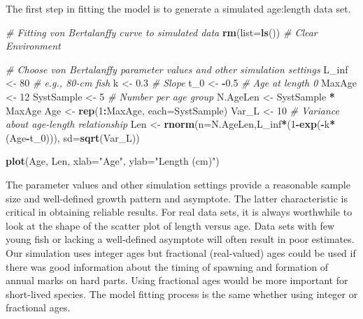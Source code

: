 \documentclass[
]{krantz}
\makeatletter
\newenvironment{Shaded}{\begin{snugshade}}{\end{snugshade}}
\newcommand{\AttributeTok}[1]{\textcolor[rgb]{0.27,0.27,0.27}{#1}}
\newcommand{\CommentTok}[1]{\textcolor[rgb]{0.37,0.37,0.37}{\textit{#1}}}
\newcommand{\DecValTok}[1]{\textcolor[rgb]{0.06,0.06,0.06}{#1}}
\newcommand{\FloatTok}[1]{\textcolor[rgb]{0.06,0.06,0.06}{#1}}
\newcommand{\FunctionTok}[1]{\textcolor[rgb]{0.27,0.27,0.27}{\textbf{#1}}}
\newcommand{\NormalTok}[1]{#1}
\newcommand{\OtherTok}[1]{\textcolor[rgb]{0.37,0.37,0.37}{#1}}
\newcommand{\SpecialCharTok}[1]{\textcolor[rgb]{0.43,0.43,0.43}{\textbf{#1}}}
\newcommand{\StringTok}[1]{\textcolor[rgb]{0.5,0.5,0.5}{#1}}
\newenvironment{kframe}{%
\medskip{}
\setlength{\fboxsep}{.8em}
 \def\at@end@of@kframe{}%
 \ifinner\ifhmode%
  \def\at@end@of@kframe{\end{minipage}}%
  \begin{minipage}{\columnwidth}%
 \fi\fi%
 \def\FrameCommand##1{\hskip\@totalleftmargin \hskip-\fboxsep
 \colorbox{shadecolor}{##1}\hskip-\fboxsep
     \hskip-\linewidth \hskip-\@totalleftmargin \hskip\columnwidth}%
 \MakeFramed {\advance\hsize-\width
   \@totalleftmargin\z@ \linewidth\hsize
   \@setminipage}}%
 {\par\unskip\endMakeFramed%
 \at@end@of@kframe}
\renewenvironment{Shaded}{\begin{kframe}}{\end{kframe}}
\makeatother
\begin{document}
The first step in fitting the model is to generate a simulated age:length data set.

\begin{Shaded}
\begin{Highlighting}[]
\CommentTok{\# Fitting von Bertalanffy curve to simulated data}
\FunctionTok{rm}\NormalTok{(}\AttributeTok{list=}\FunctionTok{ls}\NormalTok{()) }\CommentTok{\# Clear Environment}

\CommentTok{\# Choose von Bertalanffy parameter values and other simulation settings}
\NormalTok{L\_inf }\OtherTok{\textless{}{-}} \DecValTok{80}  \CommentTok{\# e.g., 80{-}cm fish}
\NormalTok{k }\OtherTok{\textless{}{-}} \FloatTok{0.3} \CommentTok{\# Slope}
\NormalTok{t\_0 }\OtherTok{\textless{}{-}} \SpecialCharTok{{-}}\FloatTok{0.5} \CommentTok{\# Age at length 0}
\NormalTok{MaxAge }\OtherTok{\textless{}{-}} \DecValTok{12}
\NormalTok{SystSample }\OtherTok{\textless{}{-}} \DecValTok{5}  \CommentTok{\# Number per age group}
\NormalTok{N.AgeLen }\OtherTok{\textless{}{-}}\NormalTok{ SystSample }\SpecialCharTok{*}\NormalTok{ MaxAge}
\NormalTok{Age }\OtherTok{\textless{}{-}} \FunctionTok{rep}\NormalTok{(}\DecValTok{1}\SpecialCharTok{:}\NormalTok{MaxAge, }\AttributeTok{each=}\NormalTok{SystSample)}
\NormalTok{Var\_L }\OtherTok{\textless{}{-}} \DecValTok{10} \CommentTok{\# Variance about age{-}length relationship}
\NormalTok{Len }\OtherTok{\textless{}{-}} \FunctionTok{rnorm}\NormalTok{(}\AttributeTok{n=}\NormalTok{N.AgeLen,L\_inf}\SpecialCharTok{*}\NormalTok{(}\DecValTok{1}\SpecialCharTok{{-}}\FunctionTok{exp}\NormalTok{(}\SpecialCharTok{{-}}\NormalTok{k}\SpecialCharTok{*}\NormalTok{(Age}\SpecialCharTok{{-}}\NormalTok{t\_0))), }\AttributeTok{sd=}\FunctionTok{sqrt}\NormalTok{(Var\_L))}

\FunctionTok{plot}\NormalTok{(Age, Len, }\AttributeTok{xlab=}\StringTok{"Age"}\NormalTok{, }\AttributeTok{ylab=}\StringTok{"Length (cm)"}\NormalTok{)}
\end{Highlighting}
\end{Shaded}

The parameter values and other simulation settings provide a reasonable sample size and well-defined growth pattern and asymptote. The latter characteristic is critical in obtaining reliable results. For real data sets, it is always worthwhile to look at the shape of the scatter plot of length versus age. Data sets with few young fish or lacking a well-defined asymptote will often result in poor estimates. Our simulation uses integer ages but fractional (real-valued) ages could be used if there was good information about the timing of spawning and formation of annual marks on hard parts. Using fractional ages would be more important for short-lived species. The model fitting process is the same whether using integer or fractional ages.
\end{document}
